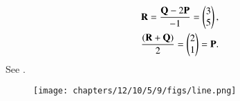 \begin{align}
\mathbf{R} = \frac{\mathbf{Q} -2\mathbf{P}}{-1} 
= \begin{pmatrix}3\\5\end{pmatrix},
\\
\frac{ (\mathbf{R} + \mathbf{Q})}{2}
=\begin{pmatrix}2\\1\end{pmatrix} =\mathbf{P}.
\end{align}
See 
.
\begin{figure}[H]
	\begin{center}
		\texttt{[image: chapters/12/10/5/9/figs/line.png]}
	\end{center}
\caption{}
\label{fig:chapters/12/10/5/9/Figure1}
\end{figure}
